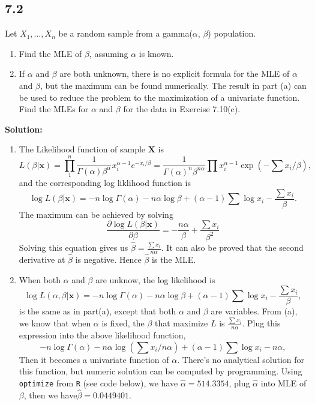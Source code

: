 \documentclass[11pt]{article}
\newcommand{\X}{\mathbf{X}}
\newcommand{\x}{\mathbf{x}}
\newcommand{\Sol}{\par {\bf Solution:}}
\newcommand{\sample}[1]{#1_1 , \dots , #1_n}
\begin{document}
\subsection*{7.2} 
Let $\sample{X}$ be a random sample from a gamma($\alpha$, $\beta$) population.
\begin{enumerate}[label=(\alph*)]
\item Find the MLE of $\beta$, assuming $\alpha$ is known.
\item If $\alpha$ and $\beta$ are both unknown, there is no explicit formula for the MLE of $\alpha$ and $\beta$,
but the maximum can be found numerically. The result in part (a) can be used to reduce the problem to the maximization of a univariate function. Find the MLEs for $\alpha$ and $\beta$ for the data in Exercise 7.10(c).
\end{enumerate}

\Sol
\begin{enumerate}[label=(\alph*)]
    \item 
    The Likelihood function of sample $\X$ is
    \[
    L(\beta|\x) = \prod \limits_1^n \frac{1}{\Gamma(\alpha)\beta^\alpha}x_i^{\alpha -1}e^{-x_i/\beta} = 
    \frac{1}{\Gamma(\alpha)^n\beta^{n\alpha}} \prod x_i^{\alpha - 1} \exp(-\sum x_i / \beta),
    \]
    and the corresponding log liklihood function is
    \[
    \log L(\beta|\x) = -n \log \Gamma(\alpha) - n\alpha \log \beta + (\alpha -1) \sum \log x_i - \frac{\sum x_i}{\beta}.
    \]
    The maximum can be achieved by solving 
    \[
    \frac{\partial\log L(\beta|\x)}{\partial \beta} = -\frac{n\alpha}{\beta} + \frac{\sum x_i}{\beta^2}
    \]
    Solving this equation gives us
    $\hat \beta = \frac{\sum x_i}{n\alpha}.$
    It can also be proved that the second derivative at $\hat \beta$ is negative. Hence $\hat \beta$ is the MLE.
    \item
    When both $\alpha$ and $\beta$ are unknow, the log likelihood is 
    \[
        \log L(\alpha, \beta|\x) = -n \log \Gamma(\alpha) - n\alpha \log \beta + (\alpha -1) \sum \log x_i - \frac{\sum x_i}{\beta},
    \]
    is the same as in part(a), except that both $\alpha$ and $\beta$ are variables.
    From (a), we know that when $\alpha$ is fixed, the $\beta$ that maximize $L$ is $\frac{\sum x_i}{n \alpha}$. Plug this expression into the above likelihood function,
    \[
    -n \log \Gamma(\alpha) - n\alpha \log (\sum x_i/n\alpha) + (\alpha -1) \sum \log x_i - n\alpha,
    \]
    Then it becomes a univariate function of $\alpha$.
    There's no analytical solution for this function, but numeric solution can be computed by programming.
    Using \lstinline{optimize} from \lstinline{R} (see code below), we have $\hat\alpha = 514.3354$, plug $\hat \alpha$ into MLE of $\beta$, then we have$\hat \beta = 0.0449401$.

    
    
\end{enumerate}
\end{document}
